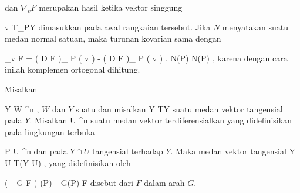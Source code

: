 dan $\nabla_v F$ merupakan hasil ketika vektor singgung

\mavergleichskette
{\vergleichskette
{ v
}
{ \in }{ T_PY
}
{  }{
}
{    }{
}
{   }{
}
}
{}{}{}
dimasukkan pada awal rangkaian tersebut. Jika $N$ menyatakan suatu medan normal satuan, maka turunan kovarian sama dengan

\mavergleichskettedisp
{\vergleichskette
{ \nabla_v F
}
{ =} { \left(  D F   \right)_{ P } \left(  v  \right) -  \left\langle  \left(  D F   \right)_{ P } \left(  v  \right)  ,  N(P)  \right\rangle N(P)
}
{ } {
}
{ } {
}
{ } {
}
}
{}{}{,}
karena dengan cara inilah komplemen ortogonal dihitung.

{}
{

Misalkan

\mavergleichskette
{\vergleichskette
{ Y
}
{ \subseteq }{ W
}
{ \subseteq }{ \R^n
}
{    }{
}
{   }{
}
}
{}{}{,}
$W$
dan $Y$ suatu
dan misalkan
 { Y } { TY
} {}
suatu medan vektor tangensial pada $Y$. Misalkan
 { U} { \R^n
} {}
suatu medan vektor terdiferensialkan yang didefinisikan pada lingkungan terbuka

\mavergleichskette
{\vergleichskette
{ P
}
{ \in }{ U
}
{ \subseteq }{ \R^n
}
{    }{
}
{   }{
}
}
{}{}{}
dan pada $Y \cap U$ tangensial terhadap $Y$. Maka medan vektor tangensial
 { Y \cap U } { T(Y \cap U)
} {,}
yang didefinisikan oleh

\mavergleichskettedisp
{\vergleichskette
{ \left(  \nabla_G F  \right) (P)
}
{ } { \nabla_{G(P)} F }
{ } {
}
{ } {
}
{ } {
}
}
{}{}{}
disebut
dari $F$ dalam arah $G$.

}



